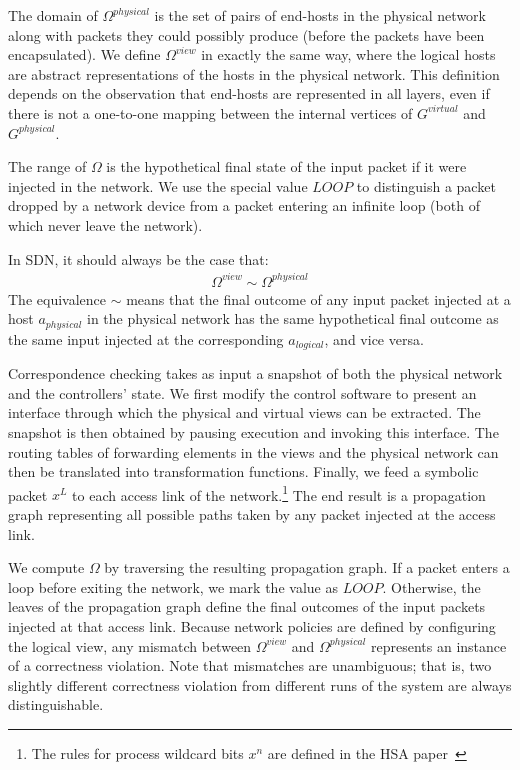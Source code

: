 The domain of $\Omega^{physical}$ is the set of pairs of end-hosts in the
physical network along with packets they could possibly produce (before
the packets have been encapsulated). We define $\Omega^{view}$ in exactly the same way, where
the logical hosts are abstract representations of the hosts in the physical
network. This definition depends on the observation that end-hosts are represented
in all layers, even if there is not a one-to-one mapping between the
internal vertices of $G^{virtual}$ and $G^{physical}$.

The range of $\Omega$ is the hypothetical final state of the
input packet if it were injected in the network.
We use the special value $LOOP$ to distinguish
a packet dropped by a network device from a packet entering an
infinite loop (both of which never leave the network).

In SDN, it should always be the case that:
\begin{align*}
\Omega^{view} \sim \Omega^{physical}
\end{align*}
The equivalence $\sim$ means that the final outcome of any input packet
injected at a host $a_{physical}$ in the physical network has the same hypothetical final outcome as
the same input injected at the corresponding $a_{logical}$, and vice versa.

Correspondence checking takes as input a
snapshot of both the physical network and the
controllers' state. We first modify the control software to present an
interface through which the physical and virtual views can be
extracted. The snapshot is
then obtained by pausing execution and invoking this interface.
The routing tables of forwarding elements in the views and the physical
network can then be translated into transformation functions.
Finally, we feed a symbolic packet $x^L$ to each access link of the
network.\footnote{The rules for process wildcard bits $x^n$ are defined in
the HSA paper~\cite{hsa}} The end result is a propagation graph representing
all possible paths taken by any packet injected
at the access link.

We compute $\Omega$ by traversing the resulting propagation graph. If a packet
enters a loop before exiting the network, we mark the value as
$LOOP$. Otherwise,
the leaves of the propagation graph define the final outcomes of the input
packets injected at that access link. Because network policies are defined by
configuring the logical view, any mismatch between $\Omega^{view}$ and $\Omega^{physical}$
represents an instance of a correctness violation. Note that mismatches are
unambiguous; that is, two slightly different correctness violation from
different runs of the system are always distinguishable.

